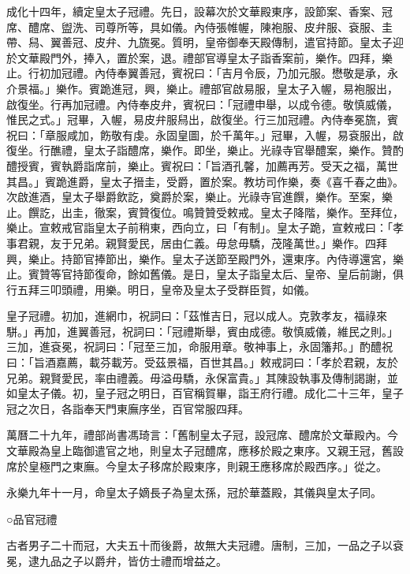 成化十四年，續定皇太子冠禮。先日，設幕次於文華殿東序，設節案、香案、冠席、醴席、盥洗、司尊所等，具如儀。內侍張帷幄，陳袍服、皮弁服、袞服、圭帶、舄、翼善冠、皮弁、九旒冕。質明，皇帝御奉天殿傳制，遣官持節。皇太子迎於文華殿門外，捧入，置於案，退。禮部官導皇太子詣香案前，樂作。四拜，樂止。行初加冠禮。內侍奉翼善冠，賓祝曰：「吉月令辰，乃加元服。懋敬是承，永介景福。」樂作。賓跪進冠，興，樂止。禮部官啟易服，皇太子入幄，易袍服出，啟復坐。行再加冠禮。內侍奉皮弁，賓祝曰：「冠禮申舉，以成令德。敬慎威儀，惟民之式。」冠畢，入幄，易皮弁服舄出，啟復坐。行三加冠禮。內侍奉冕旒，賓祝曰：「章服咸加，飭敬有虔。永固皇圖，於千萬年。」冠畢，入幄，易袞服出，啟復坐。行醮禮，皇太子詣醴席，樂作。即坐，樂止。光祿寺官舉醴案，樂作。贊酌醴授賓，賓執爵詣席前，樂止。賓祝曰：「旨酒孔馨，加薦再芳。受天之福，萬世其昌。」賓跪進爵，皇太子搢圭，受爵，置於案。教坊司作樂，奏《喜千春之曲》。次啟進酒，皇太子舉爵飲訖，奠爵於案，樂止。光祿寺官進饌，樂作。至案，樂止。饌訖，出圭，徹案，賓贊復位。鳴贊贊受敕戒。皇太子降階，樂作。至拜位，樂止。宣敕戒官詣皇太子前稍東，西向立，曰「有制」。皇太子跪，宣敕戒曰：「孝事君親，友于兄弟。親賢愛民，居由仁義。毋怠毋驕，茂隆萬世。」樂作。四拜興，樂止。持節官捧節出，樂作。皇太子送節至殿門外，還東序。內侍導還宮，樂止。賓贊等官持節復命，餘如舊儀。是日，皇太子詣皇太后、皇帝、皇后前謝，俱行五拜三叩頭禮，用樂。明日，皇帝及皇太子受群臣賀，如儀。

皇子冠禮。初加，進網巾，祝詞曰：「茲惟吉日，冠以成人。克敦孝友，福祿來駢。」再加，進翼善冠，祝詞曰：「冠禮斯舉，賓由成德。敬慎威儀，維民之則。」三加，進袞冕，祝詞曰：「冠至三加，命服用章。敬神事上，永固籓邦。」酌醴祝曰：「旨酒嘉薦，載芬載芳。受茲景福，百世其昌。」敕戒詞曰：「孝於君親，友於兄弟。親賢愛民，率由禮義。毋溢毋驕，永保富貴。」其陳設執事及傳制謁謝，並如皇太子儀。初，皇子冠之明日，百官稱賀畢，詣王府行禮。成化二十三年，皇子冠之次日，各詣奉天門東廡序坐，百官常服四拜。

萬曆二十九年，禮部尚書馮琦言：「舊制皇太子冠，設冠席、醴席於文華殿內。今文華殿為皇上臨御遣官之地，則皇太子冠醴席，應移於殿之東序。又親王冠，舊設席於皇極門之東廡。今皇太子移席於殿東序，則親王應移席於殿西序。」從之。

永樂九年十一月，命皇太子嫡長子為皇太孫，冠於華蓋殿，其儀與皇太子同。

○品官冠禮

古者男子二十而冠，大夫五十而後爵，故無大夫冠禮。唐制，三加，一品之子以袞冕，逮九品之子以爵弁，皆仿士禮而增益之。

